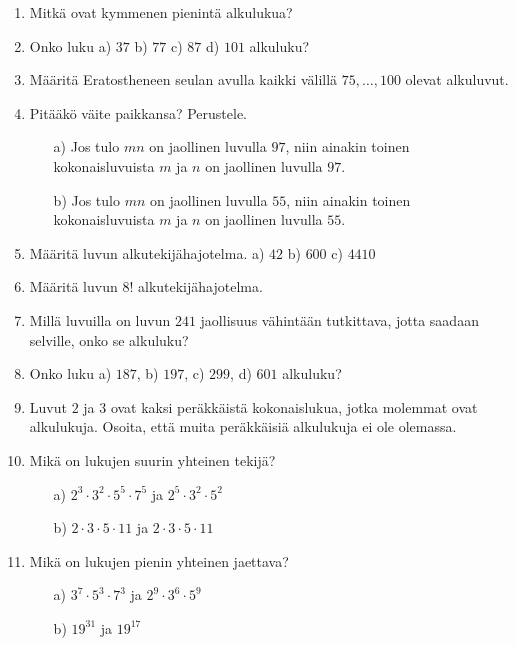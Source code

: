 \begin{enumerate}

\item Mitkä ovat kymmenen pienintä alkulukua?

\item
Onko luku a) $37$ b) $77$ c) $87$ d) $101$ alkuluku?

\item Määritä Eratostheneen seulan avulla kaikki välillä
$75,\ldots, 100$ olevat alkuluvut.

\item Pitääkö väite paikkansa? Perustele.

\begin{itemize}
\item[a)] Jos tulo $mn$ on jaollinen luvulla $97$, niin ainakin toinen kokonaisluvuista $m$ ja $n$ on jaollinen luvulla $97$.
\item[b)] Jos tulo $mn$ on jaollinen luvulla $55$, niin ainakin toinen kokonaisluvuista $m$ ja $n$ on jaollinen luvulla $55$.
\end{itemize}

\item Määritä luvun alkutekijähajotelma. a) $42$ b) $600$ c)
$4410$

\item Määritä luvun $8!$ alkutekijähajotelma.

\item
Millä luvuilla on luvun $241$ jaollisuus vähintään tutkittava,
jotta saadaan selville, onko se alkuluku?

\item Onko luku a) $187$, b) $197$, c) $299$, d) $601$ alkuluku?

\item Luvut $2$ ja $3$ ovat kaksi peräkkäistä kokonaislukua,
jotka molemmat ovat alkulukuja. Osoita, että muita peräkkäisiä
alkulukuja ei ole olemassa.

\item Mikä on lukujen suurin yhteinen tekijä?
\begin{itemize}
\item[a)] $2^3 \cdot 3^2 \cdot 5^5 \cdot 7^5$ ja $2^5 \cdot 3^2
\cdot 5^2$
\item[b)] $2 \cdot 3 \cdot 5 \cdot 11$ ja $2 \cdot 3 \cdot 5
\cdot 11$
\end{itemize}

\item Mikä on lukujen pienin yhteinen jaettava?
\begin{itemize}
\item[a)] $3^7 \cdot 5^3 \cdot 7^3$ ja $2^9 \cdot 3^6 \cdot 5^9$
\item[b)] $19^{31}$ ja $19^{17}$
\end{itemize}


\end{enumerate}
